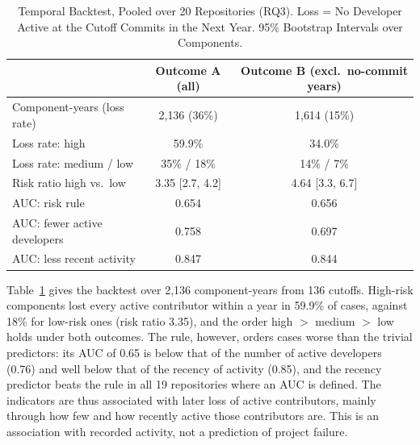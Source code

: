 \documentclass[conference]{IEEEtran}
\newcommand{\res}[1]{#1}
\begin{document}
\begin{table}[t]
\caption{Temporal Backtest, Pooled over 20 Repositories (RQ3). Loss = No Developer Active at the Cutoff Commits in the Next Year. 95\% Bootstrap Intervals over Components.}
\label{tab:backtest}
\centering
\scriptsize
\setlength{\tabcolsep}{3pt}
\begin{tabular}{lcc}
\toprule
& Outcome A (all) & Outcome B (excl.\ no-commit years) \\
\midrule
Component-years (loss rate) & \res{2{,}136} (\res{36\%}) & \res{1{,}614} (\res{15\%}) \\
Loss rate: high & \res{59.9\%} & \res{34.0\%} \\
Loss rate: medium / low & \res{35\%} / \res{18\%} & \res{14\%} / \res{7\%} \\
Risk ratio high vs.\ low & \res{3.35} [\res{2.7, 4.2}] & \res{4.64} [\res{3.3, 6.7}] \\
AUC: risk rule & \res{0.654} & \res{0.656} \\
AUC: fewer active developers & \res{0.758} & \res{0.697} \\
AUC: less recent activity & \res{0.847} & \res{0.844} \\
\bottomrule
\end{tabular}
\end{table}

Table~\ref{tab:backtest} gives the backtest over \res{2{,}136} component-years from \res{136} cutoffs. High-risk components lost every active contributor within a year in \res{59.9\%} of cases, against \res{18\%} for low-risk ones (risk ratio \res{3.35}), and the order high $>$ medium $>$ low holds under both outcomes. The rule, however, orders cases worse than the trivial predictors: its AUC of \res{0.65} is below that of the number of active developers (\res{0.76}) and well below that of the recency of activity (\res{0.85}), and the recency predictor beats the rule in all \res{19} repositories where an AUC is defined. The indicators are thus associated with later loss of active contributors, mainly through how few and how recently active those contributors are. This is an association with recorded activity, not a prediction of project failure.
\end{document}
